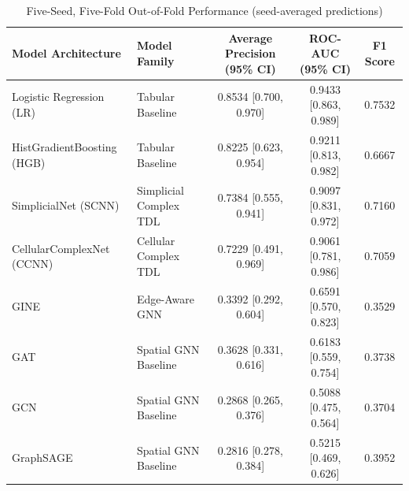 \begin{table}[htbp]
\centering
\caption{Five-Seed, Five-Fold Out-of-Fold Performance (seed-averaged predictions)}
\label{tab:model_benchmark}
\begin{tabular}{llccc}
\hline
\textbf{Model Architecture} & \textbf{Model Family} & \textbf{Average Precision (95\% CI)} & \textbf{ROC-AUC (95\% CI)} & \textbf{F1 Score} \\
\hline
Logistic Regression (LR) & Tabular Baseline & 0.8534 [0.700, 0.970] & 0.9433 [0.863, 0.989] & 0.7532 \\
HistGradientBoosting (HGB) & Tabular Baseline & 0.8225 [0.623, 0.954] & 0.9211 [0.813, 0.982] & 0.6667 \\
SimplicialNet (SCNN) & Simplicial Complex TDL & 0.7384 [0.555, 0.941] & 0.9097 [0.831, 0.972] & 0.7160 \\
CellularComplexNet (CCNN) & Cellular Complex TDL & 0.7229 [0.491, 0.969] & 0.9061 [0.781, 0.986] & 0.7059 \\
GINE & Edge-Aware GNN & 0.3392 [0.292, 0.604] & 0.6591 [0.570, 0.823] & 0.3529 \\
GAT & Spatial GNN Baseline & 0.3628 [0.331, 0.616] & 0.6183 [0.559, 0.754] & 0.3738 \\
GCN & Spatial GNN Baseline & 0.2868 [0.265, 0.376] & 0.5088 [0.475, 0.564] & 0.3704 \\
GraphSAGE & Spatial GNN Baseline & 0.2816 [0.278, 0.384] & 0.5215 [0.469, 0.626] & 0.3952 \\
\hline
\end{tabular}
\end{table}
